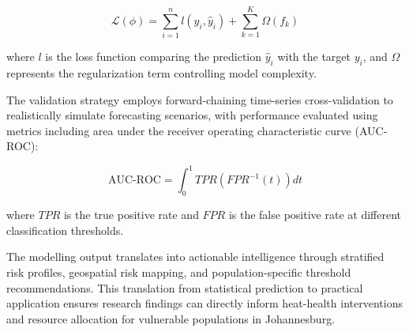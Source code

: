 \begin{equation}
\mathcal{L}(\phi) = \sum^n_{i=1} l(y_i, \hat{y}_i) + \sum^K_{k=1} \Omega(f_k)
\end{equation}

where $l$ is the loss function comparing the prediction $\hat{y}_i$ with the target $y_i$, and $\Omega$ represents the regularization term controlling model complexity.

The validation strategy employs forward-chaining time-series cross-validation to realistically simulate forecasting scenarios, with performance evaluated using metrics including area under the receiver operating characteristic curve (AUC-ROC):

\begin{equation}
\text{AUC-ROC} = \int^1_0 TPR(FPR^{-1}(t))dt
\end{equation}

where $TPR$ is the true positive rate and $FPR$ is the false positive rate at different classification thresholds.

The modelling output translates into actionable intelligence through stratified risk profiles, geospatial risk mapping, and population-specific threshold recommendations. This translation from statistical prediction to practical application ensures research findings can directly inform heat-health interventions and resource allocation for vulnerable populations in Johannesburg.